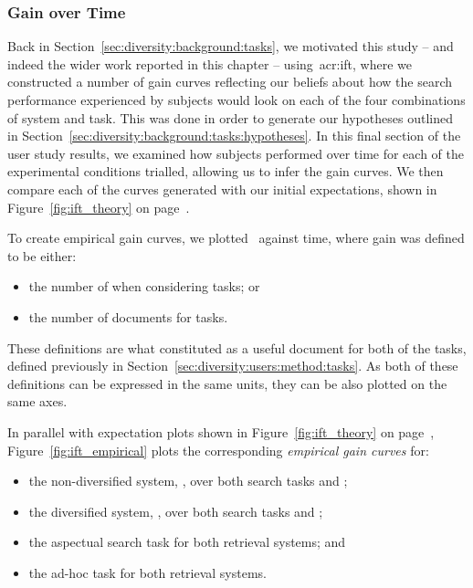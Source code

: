 \subsubsection{Gain over Time}\label{sec:diversity:users:results:ift}
Back in Section~\ref{sec:diversity:background:tasks}, we motivated this study -- and indeed the wider work reported in this chapter -- using~\gls{acr:ift}, where we constructed a number of gain curves reflecting our beliefs about how the search performance experienced by subjects would look on each of the four combinations of system and task. This was done in order to generate our hypotheses outlined in Section~\ref{sec:diversity:background:tasks:hypotheses}. In this final section of the user study results, we examined how subjects performed over time for each of the experimental conditions trialled, allowing us to infer the gain curves. We then compare each of the curves generated with our initial expectations, shown in Figure~\ref{fig:ift_theory} on page~\pageref{fig:ift_theory}.

To create empirical gain curves, we plotted~ against time, where gain was defined to be either:

\vspace*{-2mm}
\begin{itemize}
    \item{the number of  when considering  tasks; or}
    \item{the number of  documents for  tasks.}
\end{itemize}
\vspace*{-2mm}

These definitions are what constituted as a useful document for both of the tasks, defined previously in Section~\ref{sec:diversity:users:method:tasks}. As both of these definitions can be expressed in the same units, they can be also plotted on the same axes.

In parallel with expectation plots shown in Figure~\ref{fig:ift_theory} on page~\pageref{fig:ift_theory}, Figure~\ref{fig:ift_empirical} plots the corresponding \emph{empirical gain curves} for:

\begin{itemize}
    \item[\genericblack{(a)}]{the non-diversified system, , over both search tasks  and ;}
    \item[\genericblack{(b)}]{the diversified system, , over both search tasks  and ;}
    \item[\genericblack{(c)}]{the aspectual search task  for both retrieval systems; and}
    \item[\genericblack{(d)}]{the ad-hoc task  for both retrieval systems.}
\end{itemize}

